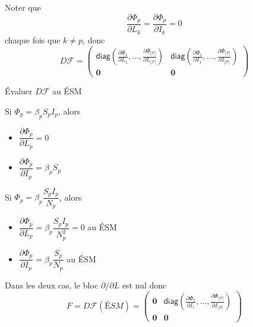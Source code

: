 \documentclass[aspectratio=169]{beamer}\usepackage[]{graphicx}\usepackage[]{xcolor}
\begin{document}
\begin{frame}
Noter que
$$
\frac{\partial\Phi_p}{\partial L_k}=\frac{\partial\Phi_p}{\partial I_k}=0
$$
chaque fois que $k\neq p$, donc
$$
D\mathcal{F}
=
\begin{pmatrix}
\mathsf{diag}\left(
\frac{\partial\Phi_1}{\partial L_1},\ldots,\frac{\partial\Phi_{|\mathcal{P}|}}{\partial L_{|\mathcal{P}|}}\right) &
\mathsf{diag}\left(
\frac{\partial\Phi_1}{\partial I_1},\ldots,\frac{\partial\Phi_{|\mathcal{P}|}}{\partial I_{|\mathcal{P}|}}\right) \\
\mathbf{0} & \mathbf{0} 
\end{pmatrix}
$$
\end{frame}

\begin{frame}{Évaluer $D\mathcal{F}$ au ÉSM}
	\begin{minipage}[t]{0.45\textwidth}
		Si $\Phi_p=\beta_pS_pI_p$, alors
		\begin{itemize}
			\item $\dfrac{\partial\Phi_p}{\partial L_p}=0$
			\item $\dfrac{\partial\Phi_p}{\partial I_p}=\beta_pS_p$
		\end{itemize}
	\end{minipage}
	\begin{minipage}[t]{0.45\textwidth}
		Si $\Phi_p=\beta_p\dfrac{S_pI_p}{N_p}$, alors
		\begin{itemize}
			\item $\dfrac{\partial\Phi_p}{\partial L_p}=\beta_p\dfrac{S_pI_p}{N_p^2}=0$ au ÉSM
			\item $\dfrac{\partial\Phi_p}{\partial I_p}=\beta_p\dfrac{S_p}{N_p}$ au ÉSM
		\end{itemize}
	\end{minipage}
	\vfill
Dans les deux cas, le bloc $\partial/\partial L$ est nul donc
$$
F=D\mathcal{F}(ÉSM)=
\begin{pmatrix}
\mathbf{0} & \mathsf{diag}\left(
\frac{\partial\Phi_1}{\partial I_1},\ldots,\frac{\partial\Phi_{|\mathcal{P}|}}{\partial I_{|\mathcal{P}|}}\right) \\
\mathbf{0} & \mathbf{0}
\end{pmatrix}
$$
\end{frame}
\end{document}
